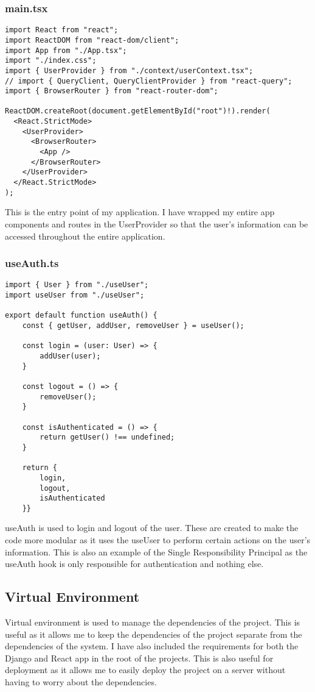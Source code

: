 \subsubsection{main.tsx}
\begin{verbatim}
import React from "react";
import ReactDOM from "react-dom/client";
import App from "./App.tsx";
import "./index.css";
import { UserProvider } from "./context/userContext.tsx";
// import { QueryClient, QueryClientProvider } from "react-query";
import { BrowserRouter } from "react-router-dom";

ReactDOM.createRoot(document.getElementById("root")!).render(
  <React.StrictMode>
    <UserProvider>
      <BrowserRouter>
        <App />
      </BrowserRouter>
    </UserProvider>
  </React.StrictMode>
);
\end{verbatim}
This is the entry point of my application. I have wrapped my entire app components and routes in the UserProvider so that the user's information can be accessed throughout the entire application.

\subsubsection{useAuth.ts}
\begin{verbatim}
import { User } from "./useUser";
import useUser from "./useUser";

export default function useAuth() {
    const { getUser, addUser, removeUser } = useUser();

    const login = (user: User) => {
        addUser(user);
    }

    const logout = () => {
        removeUser();
    }

    const isAuthenticated = () => {
        return getUser() !== undefined;
    }

    return {
        login,
        logout,
        isAuthenticated
    }}
\end{verbatim}
useAuth is used to login and logout of the user. These are created to make the code more modular as it uses the useUser to perform certain actions on the user's information. This is also an example of the Single Responsibility Principal as the useAuth hook is only responsible for authentication and nothing else.






\subsection{Virtual Environment}
Virtual environment is used to manage the dependencies of the project. This is useful as it allows me to keep the dependencies of the project separate from the dependencies of the system. I have also included the requirements for both the Django and React app in the root of the projects. This is also useful for deployment as it allows me to easily deploy the project on a server without having to worry about the dependencies.

